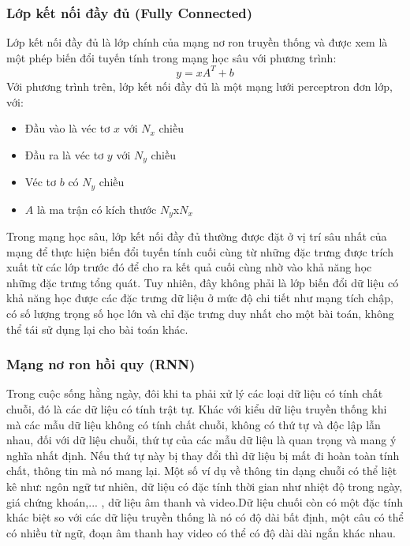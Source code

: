 \subsubsection{Lớp kết nối đầy đủ (Fully Connected)}
Lớp kết nối đầy đủ là lớp chính của mạng nơ ron truyền thống và được xem là một phép biến đổi tuyến tính trong mạng học sâu với phương trình:
\begin{equation}
    y=xA^T+b
\end{equation}
Với phương trình trên, lớp kết nối đầy đủ là một mạng lưới perceptron đơn lớp, với:
\begin{itemize}
    \item Đầu vào là véc tơ $x$ với $N_x$ chiều
    \item Đầu ra là véc tơ $y$ với $N_y$ chiều
    \item Véc tơ $b$ có $N_y$ chiều
    \item $A$ là ma trận có kích thước $N_y$x$N_x$
\end{itemize}
Trong mạng học sâu, lớp kết nối đầy đủ thường được đặt ở vị trí sâu nhất của mạng để thực hiện biến đổi tuyến tính cuối cùng từ những đặc trưng được trích xuất từ các lớp trước đó để cho ra kết quả cuối cùng nhờ vào khả năng học những đặc trưng tổng quát. Tuy nhiên, đây không phải là lớp biến đổi dữ liệu có khả năng học được các đặc trưng dữ liệu ở mức độ chi tiết như mạng tích chập, có số lượng trọng số học lớn và chỉ đặc trưng duy nhất cho một bài toán, không thể tái sử dụng lại cho bài toán khác.

\subsubsection{Mạng nơ ron hồi quy (RNN)}

Trong cuộc sống hằng ngày, đôi khi ta phải xử lý các loại dữ liệu có tính chất chuỗi, đó là các dữ liệu có tính trật tự. Khác với kiểu dữ liệu truyền thống khi mà các mẫu dữ liệu không có tính chất chuỗi, không có thứ tự và độc lập lẫn nhau, đối với dữ liệu chuỗi, thứ tự của các mẫu dữ liệu là quan trọng và mang ý nghĩa nhất định. Nếu thứ tự này bị thay đổi thì dữ liệu bị mất đi hoàn toàn tính chất, thông tin mà nó mang lại. Một số ví dụ về thông tin dạng chuỗi có thể liệt kê như: ngôn ngữ tư nhiên, dữ liệu có đặc tính thời gian như nhiệt độ trong ngày, giá chứng khoán,... , dữ liệu âm thanh và video.Dữ liệu chuối còn có một đặc tính khác biệt so với các dữ liệu truyền thống là nó có độ dài bất định, một câu có thể có nhiều từ ngữ, đoạn âm thanh hay video có thể có độ dài dài ngắn khác nhau. 

